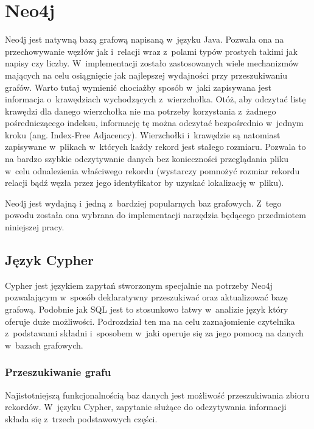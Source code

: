\documentclass[brudnopis]{xmgr}
\begin{document}
\chapter{Neo4j}

Neo4j jest natywną bazą grafową napisaną w~języku Java. Pozwala ona na przechowywanie węzłów jak i~relacji wraz z~polami typów prostych takimi jak napisy czy liczby. W~implementacji zostało zastosowanych wiele mechanizmów mających na celu osiągnięcie jak najlepszej wydajności przy przeszukiwaniu grafów. Warto tutaj wymienić chociażby sposób w~jaki zapisywana jest informacja o~krawędziach wychodzących z~wierzchołka. Otóż, aby odczytać listę krawędzi dla danego wierzchołka nie ma potrzeby korzystania z~żadnego pośredniczącego indeksu, informację tę można odczytać bezpośrednio w~jednym kroku (ang. Index-Free Adjacency\cite[s.~5]{Robinson:2013:GD}). Wierzchołki i~krawędzie są natomiast zapisywane w~plikach w~których każdy rekord jest stałego rozmiaru. Pozwala to na bardzo szybkie odczytywanie danych bez konieczności przeglądania pliku w~celu odnalezienia właściwego rekordu (wystarczy pomnożyć rozmiar rekordu relacji bądź węzła przez jego identyfikator by uzyskać lokalizację w~pliku).

Neo4j jest wydajną i~jedną z~bardziej popularnych baz grafowych. Z~tego powodu została ona wybrana do implementacji narzędzia będącego przedmiotem niniejszej pracy.

\section{Język Cypher}
Cypher jest językiem zapytań stworzonym specjalnie na potrzeby Neo4j pozwalającym w~sposób deklaratywny przeszukiwać oraz aktualizować bazę grafową. Podobnie jak SQL jest to stosunkowo łatwy w~analizie język który oferuje duże możliwości. Podrozdział ten ma na celu zaznajomienie czytelnika z~podstawami składni i~sposobem w~jaki operuje się za jego pomocą na danych w~bazach grafowych.

\subsection{Przeszukiwanie grafu}

Najistotniejszą funkcjonalnością baz danych jest możliwość przeszukiwania zbioru rekordów. W~języku Cypher, zapytanie służące do odczytywania informacji składa się z~trzech podstawowych części.
\end{document}
